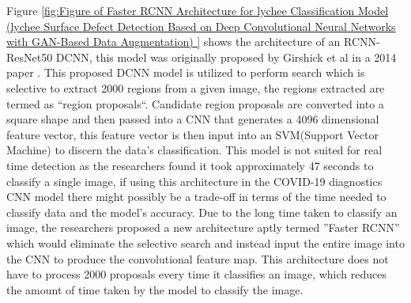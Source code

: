Figure \ref{fig:Figure of Faster RCNN Architecture for lychee Classification Model (lychee Surface Defect Detection Based on Deep Convolutional Neural Networks with GAN-Based Data Augmentation) } shows the architecture of an RCNN-ResNet50 DCNN, this model was originally proposed by Girshick et al in a 2014 paper \cite{litReviewRCNN}.  This proposed DCNN model is utilized to perform search which is selective to extract 2000 regions from a given image, the regions extracted are termed as ``region proposals``\cite{litReviewRCNN}.  Candidate region proposals are converted into a square shape and then passed into a CNN that generates a 4096 dimensional feature vector, this feature vector is then input into an SVM(Support Vector Machine) to discern the data's classification.  This model is not suited for real time detection as the researchers found it took approximately 47 seconds to classify a single image, if using this architecture in the COVID-19 diagnostics CNN model there might possibly be a trade-off in terms of the time needed to classify data and the model's accuracy.  Due to the long time taken to classify an image, the researchers proposed a new architecture aptly termed ''Faster RCNN'' which would eliminate the selective search and instead input the entire image into the  CNN to produce the convolutional feature map.  This architecture  does not have to process 2000 proposals every time it classifies an image, which reduces the amount of time taken by the model to classify the image.
